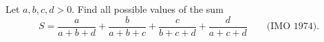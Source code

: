 Let $a, b, c, d > 0$. Find all possible values of the sum
\[ S = \frac{a}{a + b + d} + \frac{b}{a + b + c} + \frac{c}{b + c + d} + \frac{d}{a + c + d} \qquad \text{(IMO 1974).} \]
